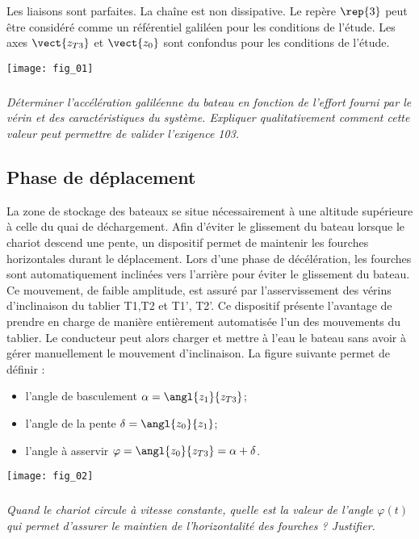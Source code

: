 \begin{multicols}{2}
Les liaisons sont parfaites. La chaîne est non dissipative. Le repère $\rep{3}$ peut être considéré comme un référentiel galiléen pour les conditions de l’étude. Les axes $\vect{z_{T3}}$ et $\vect{z_{0}}$ sont confondus pour les conditions de l’étude.

\begin{center}
\texttt{[image: fig\_01]}
\end{center}

\subparagraph{}
\textit{Déterminer l’accélération galiléenne du bateau en fonction de l’effort fourni par le vérin et des caractéristiques du système. Expliquer qualitativement comment cette valeur peut permettre de valider l'exigence 103.}
\ifprof
\begin{corrige}
\end{corrige}
\else
\fi



\subsection*{Phase de déplacement}
La zone de stockage des bateaux se situe nécessairement à une altitude supérieure à celle du quai de déchargement. Afin d’éviter le glissement du bateau lorsque le chariot descend une pente, un dispositif permet de maintenir les fourches horizontales durant le déplacement. Lors d’une phase de décélération, les fourches sont automatiquement inclinées vers l’arrière pour éviter le glissement du bateau. Ce mouvement, de faible amplitude, est assuré par l’asservissement des vérins d’inclinaison du tablier T1,T2 et T1’, T2’. Ce dispositif présente l’avantage de prendre en charge de manière entièrement automatisée l’un des mouvements du tablier. Le conducteur peut alors charger et mettre à l’eau le bateau sans avoir à gérer manuellement le mouvement d’inclinaison.
La figure suivante permet de définir :
\begin{itemize}
\item l'angle de basculement $\alpha=\angl{z_1}{z_{T3}}$;
\item l'angle de la pente $\delta=\angl{z_0}{z_1}$;
\item l'angle à asservir  $\varphi=\angl{z_0}{z_{T3}}=\alpha+\delta$.
\end{itemize}


\begin{center}
\texttt{[image: fig\_02]}
\end{center}


\subparagraph{}
\textit{Quand le chariot circule à vitesse constante, quelle est la valeur de l’angle $\varphi(t)$ qui permet d’assurer le maintien de l’horizontalité des fourches ? Justifier.}
\ifprof
\begin{corrige}
\end{corrige}
\else
\fi




\end{multicols}
